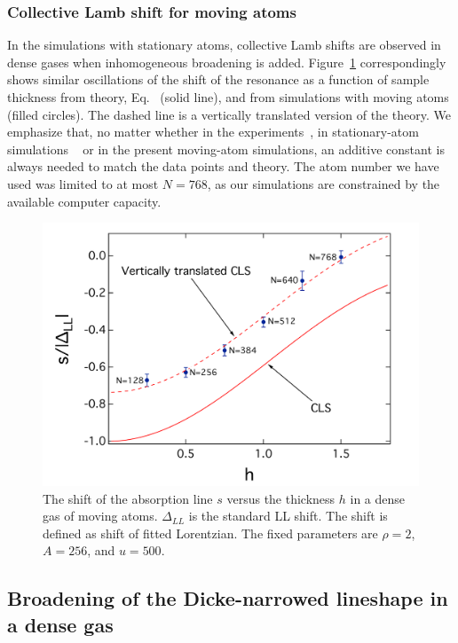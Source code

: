 \subsubsection{Collective Lamb shift for moving atoms}
 
In the simulations with stationary atoms, collective Lamb shifts are observed in dense gases when inhomogeneous broadening is added. Figure~\ref{CLS} correspondingly shows similar oscillations of the shift of the resonance as a function of sample thickness from theory, Eq.~ (solid line), and from simulations with moving atoms (filled circles). The dashed line is a vertically translated version of the theory. We emphasize that, no matter whether in the experiments~\cite{PhysRevLett.108.173601}, in stationary-atom simulations ~\cite{PhysRevLett.112.113603} or in the present moving-atom simulations, an additive constant is always needed to match the data points and theory.  The atom number we have used was limited to at most $N=768$, as our simulations are constrained by the available computer capacity. 

\begin{figure}[h!]
\begin{center}
\includegraphics[width=\textwidth]{CLS.pdf}
\end{center}
\caption{The shift of the absorption line $s$ versus the thickness $h$ in a dense gas of moving atoms. $\Delta_{LL}$ is the standard LL shift. The shift is defined as shift of fitted Lorentzian.  The fixed parameters are $\rho=2$, $A=256$, and $u=500$.}
\label{CLS}
\end{figure}

\subsection{Broadening of the Dicke-narrowed lineshape in a dense gas}

